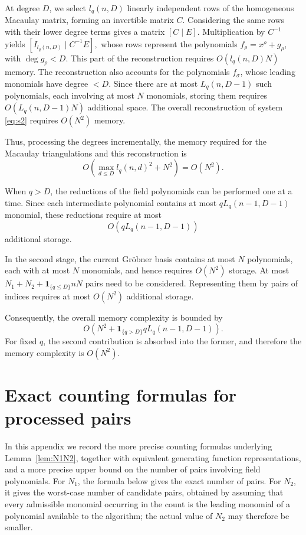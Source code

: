 \documentclass[a4paper, 12pt, oneside, openright]{article}
\begin{document}
At degree $D$, we select $l_q(n,D)$ linearly independent rows of the homogeneous Macaulay matrix, forming an invertible matrix $C$. Considering the same rows with their lower degree terms gives a matrix $[C\mid E]$.
Multiplication by $C^{-1}$ yields $[I_{l_q(n,D)}\mid C^{-1}E],$ whose rows represent the polynomials $f_\rho=x^\rho+g_\rho$, with $\deg g_\rho<D$.
This part of the reconstruction requires $O(l_q(n,D)N)$ memory.
The reconstruction also accounts for the polynomials $f_\sigma$, whose leading monomials have degree $<D$. Since there are at most $L_q(n,D-1)$ such polynomials, each involving at most $N$ monomials, storing them requires $O(L_q(n,D-1)N)$ additional space.
The overall reconstruction of system \eqref{eq:s2} requires $O(N^2)$ memory.

Thus, processing the degrees incrementally, the memory required for the Macaulay triangulations and this reconstruction is
\[
O\left(
\max_{d\le D} l_q(n,d)^2+N^2
\right)
=O(N^2).
\]


When $q>D$, the reductions of the field polynomials can be performed one at a time. Since each intermediate polynomial contains at most $qL_q(n-1,D-1)$ monomial, these reductions require at most
\[
O\left(qL_q(n-1,D-1)\right)
\]
additional storage.

In the second stage, the current Gr\"{o}bner basis contains at most $N$ polynomials, each with at most $N$ monomials, and hence requires $O(N^2)$ storage. At most $N_1+N_2+\mathbf{1}_{\{q\le D\}}nN$ pairs need to be considered. Representing them by pairs of indices requires at most $O(N^2)$ additional storage.

Consequently, the overall memory complexity is bounded by
\[
O\left(
N^2+\mathbf{1}_{\{q>D\}}qL_q(n-1,D-1)
\right).
\]
For fixed $q$, the second contribution is absorbed into the former, and therefore the memory complexity is $O(N^2)$.





\appendix
\section{Exact counting formulas for processed pairs}
\label{app:exactPairs}

In this appendix we record the more precise counting formulas underlying Lemma~\ref{lem:N1N2}, together with equivalent generating function representations, and a more precise upper bound on the number of pairs involving field polynomials. For $N_1$, the formula below gives the exact number of pairs. For $N_2$, it gives the worst-case number of candidate pairs, obtained by assuming that every admissible monomial occurring in the count is the leading monomial of a polynomial available to the algorithm; the actual value of $N_2$ may therefore be smaller.
\end{document}

